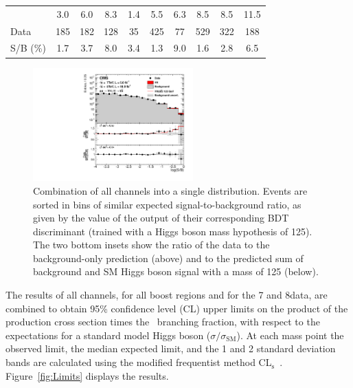 \documentclass[11pt,twoside,a4paper,cmspaper,final,collab]{cms-tdr}
\begin{document}
\begin{table}[htbp]
\begin{center}
{\begin{tabular}{lccccccccc}
\VH       		   	&	3.0    		&	6.0            &8.3              	&1.4  &5.5               &6.3                &8.5               &8.5               &11.5               \\
Data     		   	&	185         	&	182      	      &128        	&35   &425               &77                 &529               &322               &188                \\ \hline
S/B  (\%)  		   	&	1.7          		&	3.7     		      &8.0	&3.4  &1.3         & 9.0               &1.6             &2.8             &6.5              \\
\hline\hline
\end{tabular}
}
\label{table:3bin_yields}
\end{center}
\end{table}


\begin{figure}[htb]
\begin{center}
\includegraphics[width=0.55\textwidth]{PRD_BDT_Summary_Oct10}
\caption{Combination of all channels into a single distribution. Events are sorted in bins of similar expected signal-to-background
ratio, as given by the value of the output of their corresponding BDT
discriminant (trained with a Higgs boson mass hypothesis of 125\GeV).
The two bottom insets show the ratio of the data to the background-only
prediction (above) and to the predicted sum of background and SM Higgs
boson signal with a mass of 125\GeV
(below).}
    \label{fig:BDT_S_over_B_all}
  \end{center}
\end{figure}


The results of all
channels, for all boost regions and for the 7 and
8\TeV data, are combined to obtain 95\% confidence level (CL) upper limits
on the product of the \VH production cross section times the \HBB\
branching fraction, with respect to the expectations for a standard model
Higgs boson ($\sigma/\sigma_{\mathrm{SM}}$). At
each mass point the observed limit,  the median expected limit, and the 1 and 2 standard
deviation bands are
calculated using the modified frequentist method
CL$_\mathrm{s}$~\cite{Read:2002hq,junkcls,LHC-HCG}. Figure~\ref{fig:Limits}
displays the results.
\end{document}
